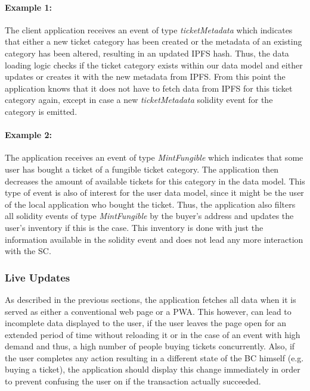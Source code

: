 \paragraph{Example 1:} The client application receives an event of type \textit{ticketMetadata} which indicates that either a new ticket category has been created or the metadata of an existing category has been altered, resulting in an updated IPFS hash. Thus, the data loading logic checks if the ticket category exists within our data model and either updates or creates it with the new metadata from IPFS. From this point the application knows that it does not have to fetch data from IPFS for this ticket category again, except in case a new \textit{ticketMetadata} solidity event for the category is emitted. 

\paragraph{Example 2:} The application receives an event of type \textit{MintFungible} which indicates that some user has bought a ticket of a fungible ticket category. The application then decreases the amount of available tickets for this category in the data model. This type of event is also of interest for the user data model, since it might be the user of the local application who bought the ticket. Thus, the application also filters all solidity events of type \textit{MintFungible} by the buyer's address and updates the user's inventory if this is the case. This inventory is done with just the information available in the solidity event and does not lead any more interaction with the SC.

\subsubsection{Live Updates}

As described in the previous sections, the application fetches all data when it is served as either a conventional web page or a PWA. This however, can lead to incomplete data displayed to the user, if the user leaves the page open for an extended period of time without reloading it or in the case of an event with high demand and thus, a high number of people buying tickets concurrently. Also, if the user completes any action resulting in a different state of the BC himself (e.g. buying a ticket), the application should display this change immediately in order to prevent confusing the user on if the transaction actually succeeded. 

